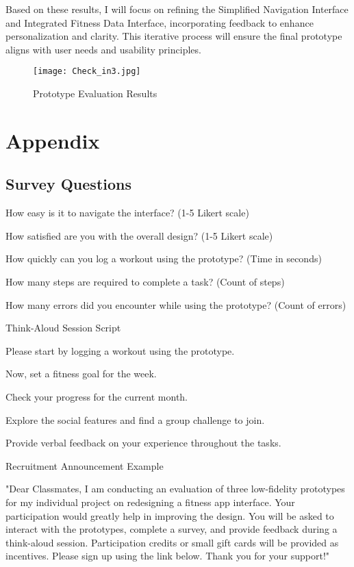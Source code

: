 \documentclass[
	letterpaper, %
]{jdf}
\begin{document}
Based on these results, I will focus on refining the Simplified Navigation Interface and Integrated Fitness Data Interface, incorporating feedback to enhance personalization and clarity. This iterative process will ensure the final prototype aligns with user needs and usability principles.

\begin{figure}
    \centering
    \texttt{[image: Check\_in3.jpg]}
    \caption{Prototype Evaluation Results}
    \label{fig:enter-label}
\end{figure}

\newpage

\section{Appendix}
\subsection{Survey Questions}

How easy is it to navigate the interface? (1-5 Likert scale)

How satisfied are you with the overall design? (1-5 Likert scale)

How quickly can you log a workout using the prototype? (Time in seconds)

How many steps are required to complete a task? (Count of steps)

How many errors did you encounter while using the prototype? (Count of errors)

Think-Aloud Session Script

Please start by logging a workout using the prototype.

Now, set a fitness goal for the week.

Check your progress for the current month.

Explore the social features and find a group challenge to join.

Provide verbal feedback on your experience throughout the tasks.

Recruitment Announcement Example

"Dear Classmates, I am conducting an evaluation of three low-fidelity prototypes for my individual project on redesigning a fitness app interface. Your participation would greatly help in improving the design. You will be asked to interact with the prototypes, complete a survey, and provide feedback during a think-aloud session. Participation credits or small gift cards will be provided as incentives. Please sign up using the link below. Thank you for your support!"
\end{document}
